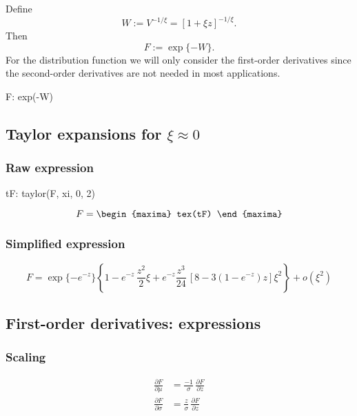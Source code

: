 Define
$$
W := V^{-1/\xi} = [1 + \xi z]^{-1/\xi}.
$$
Then
$$
 F := \exp\{ - W \}.
$$
For the distribution function we will only consider the first-order derivatives
since the second-order derivatives are not needed in most applications.

\begin{maxima}
  F: exp(-W)
\end{maxima}

\subsection{Taylor expansions for $\xi \approx 0$}
\subsubsection*{Raw expression}

\begin{maxima}
  tF: taylor(F, xi, 0, 2)
\end{maxima}

{\color{MonVertF}  
\begin{equation*}
  F =
  \begin{maxima}
    tex(tF)
  \end{maxima}
\end{equation*}
}
\subsubsection*{Simplified expression}
{\color{red}
$$
F = \exp\{-e^{-z}\} \left\{ 1 - e^{-z} \,\frac{z^2}{2} \xi +
  e^{-z} \frac{z^3}{24} \,\left[ 8 - 3 (1 - e^{-z}) z \right] \xi^2 \right\} +
  o(\xi^2)
$$}

\subsection{First-order derivatives: expressions}

\subsubsection*{Scaling}

\begin{align*}
\frac{\partial F}{\partial \mu} &= \frac{-1}{\sigma} \,\frac{\partial F}{\partial z}\\
\frac{\partial F}{\partial \sigma} &= \frac{z}{\sigma} \,\frac{\partial F}{\partial z}\\
\end{align*}


